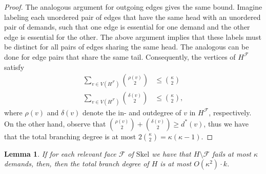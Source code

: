 \documentclass[a4paper,11pt]{article}
\newcommand{\calF}{\mathcal{F}}
\newcommand{\Skel}{\mathrm{Skel}}
\theoremstyle{plain}
\newtheorem{lemma}[theorem]{Lemma}
\newtheorem{identification rule}{Identification Rule}
\theoremstyle{definition}
\theoremstyle{remark}
\begin{document}
\begin{proof}
The analogous argument for outgoing edges gives the same bound. Imagine labeling each unordered pair of edges that have the same head with an unordered pair of demands, such that one edge is essential for one demand and the other edge is essential for the other. The above argument implies that these labels must be distinct for all pairs of edges sharing the same head. The analogous can be done for edge pairs that share the same tail. Consequently, the vertices of $H^\calF$ satisfy 
\begin{align*}
\sum_{v\in V(H^\calF)} \binom{\rho(v)}{2} &\leq \binom{\kappa}{2}\\
\sum_{v\in V(H^\calF)} \binom{\delta(v)}{2} &\leq \binom{\kappa}{2},
\end{align*}
where $\rho(v)$ and $\delta(v)$ denote the in- and outdegree of $v$ in $H^\calF$, respectively. On the other hand, observe that $\binom{\rho(v)}{2} + \binom{\delta(v)}{2} \geq d^*(v)$, thus we have that the total branching degree is at most $2\binom{\kappa}{2}=\kappa(\kappa-1)$.
\end{proof}

\begin{lemma}\label{lem:cbound_face_to_full}
If for each relevant face $\calF$ of $\Skel$ we have that $H\setminus \calF$ fails at most $\kappa$ demands, then, then the total branch degree of $H$ is at most $O(\kappa^2)\cdot k$.
\end{lemma}
\end{document}
